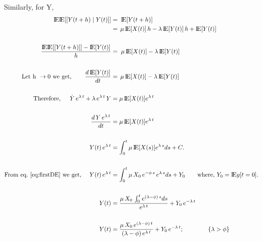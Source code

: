 \documentclass[11pt]{article} %
\newcommand{\expE}{\text{I\kern-0.15em E}}
\begin{document}
Similarly, for Y,
\begin{eqnarray}
\begin{aligned}
    \expE\expE[[Y(t+h) \;|\; Y(t)]] &= \; \expE[Y(t+h)] \\
    &= \,  \mu \, \expE[X(t)] \, h - \lambda \, \expE[Y(t)] \, h + \expE[Y(t)] \\
    \\
    \frac{\expE\expE[[Y(t+h)]] - \expE[Y(t)]}{h} &= \;  \mu \, \expE[X(t)]  - \lambda \, \expE[Y(t)] \\
    \\
    \text{Let h } \rightarrow 0 \text{ we get}, \qquad \frac{d\, \expE[Y(t)]}{dt} &= \,  \mu \, \expE[X(t)] - \lambda \, \expE[Y(t)] \\
    \\
    \text{Therefore, } \quad \, \dot{Y} \, e^{\lambda \, t} + \lambda \, e^{\lambda \, t} \, Y &= \mu \, \expE[X(t)]  e^{\lambda \, t} \\
    \\
    \frac{d \, Y \, e^{\lambda \, t}}{dt} &= \mu \, \expE[X(t)]  e^{\lambda \, t} \\
    \\
    Y(t) \, e^{\lambda \, t} &= \int_{0}^{t} \mu \, \expE[X(s)]  e^{\lambda \, s} ds + C. \\
    \\
    \text{From eq.~\ref{eq:firstDE} we get, } \quad Y(t) \, e^{\lambda \, t} &= \int_{0}^{t} \mu \, X_0 \, e^{-\phi \, s} \,   e^{\lambda \, s} ds + Y_0 \quad \quad \text{where, } Y_0 = \expE{y[t=0]}. \\
    \\
    Y(t) &= \frac{\mu \, X_0 \, \int_{0}^{t} e^{(\lambda - \phi) \, s} ds } {e^{\lambda \, t}} + Y_0 \, e^{-\lambda \, t} \\
    \\
    Y(t) &= \frac{\mu \, X_0 \, e^{(\lambda - \phi) \, t}} {(\lambda - \phi) \, e^{\lambda \, t}} + Y_0 \, e^{-\lambda \, t}; \qquad \qquad  \{\lambda > \phi\} \\
\end{aligned}
\end{eqnarray}
\end{document}
